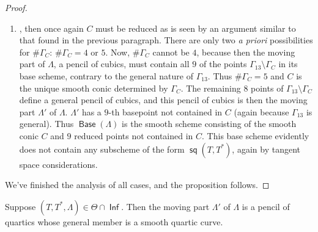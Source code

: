 \documentclass{article}
\DeclareMathOperator{\s}{\mathsf{sq}}
\DeclareMathOperator{\Inf}{\mathsf{Inf}}
\DeclareMathOperator{\Base}{\mathsf{Base}}
\begin{document}
\begin{proof}
\begin{enumerate}
  \item {}, then once again $C$ must be reduced as is seen by
  an argument similar to that found in the previous paragraph.  There
  are only two {\sl a priori} possibilities for $\# \Gamma_{C}$:
  $\# \Gamma_{C} = 4$ or $5$. Now, $\# \Gamma_{C}$ cannot be $4$,
  because then the moving part of $\Lambda$, a pencil of cubics, must
  contain all $9$ of the points $\Gamma_{13} \setminus \Gamma_{C}$ in
  its base scheme, contrary to the general nature of $\Gamma_{13}$.
  Thus $\# \Gamma_{C} = 5$ and $C$ is the unique smooth conic
  determined by $\Gamma_{C}$.  The remaining $8$ points of
  $\Gamma_{13} \setminus \Gamma_{C}$ define a general pencil of
  cubics, and this pencil of cubics is then the moving part $\Lambda'$ of $\Lambda$. $\Lambda'$ has
  a $9$-th basepoint not contained in $C$ (again because $\Gamma_{13}$ is
  general). Thus $\Base(\Lambda)$ is the smooth scheme consisting of
  the smooth conic $C$ and $9$ reduced points not contained in $C$. This base
  scheme evidently does not contain any subscheme of the form
  $\s(T,T^{*})$, again by tangent space considerations.
\end{enumerate}
  We've finished the analysis of all cases, and the proposition
  follows.
\end{proof}


\begin{proposition}
    \label{proposition:Movesingular} Suppose $(T,T^{*},\Lambda) \in \Theta \cap \Inf$.  Then the moving part $\Lambda'$ of $\Lambda$ is a pencil of quartics whose general member is a smooth quartic curve.
\end{proposition}
\end{document}
